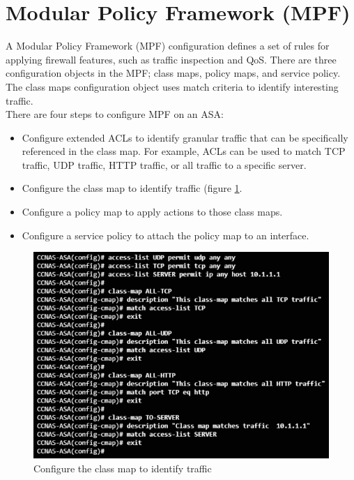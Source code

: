 \section{Modular Policy Framework (MPF)}

A Modular Policy Framework (MPF) configuration defines a set of rules for applying firewall features, such as traffic inspection and QoS. There are three configuration objects in the MPF; class maps, policy maps, and service policy. The class maps configuration object uses match criteria to identify interesting traffic.\\

There are four steps to configure MPF on an ASA:

\begin{itemize}
\item Configure extended ACLs to identify granular traffic that can be specifically referenced in the class map. For example, ACLs can be used to match TCP traffic, UDP traffic, HTTP traffic, or all traffic to a specific server.

\item Configure the class map to identify traffic (figure \ref{classmap}.

\item Configure a policy map to apply actions to those class maps.

\item Configure a service policy to attach the policy map to an interface.
\end{itemize}

\begin{figure}[hbtp]
\caption{Configure the class map to identify traffic}\label{classmap}
\centering
\includegraphics[scale=0.7]{pictures/classmap.PNG}
\end{figure}

